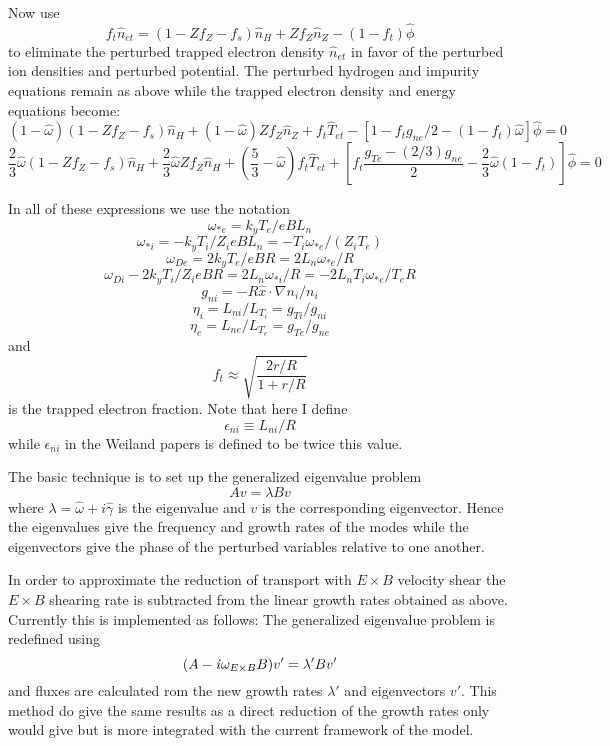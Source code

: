 Now use
\[ f_t \hat{n}_{et} = ( 1 - Z f_Z - f_s ) \hat{n}_H
   + Z f_Z \hat{n}_Z - ( 1 - f_t ) \hat{\phi} \]
to eliminate the perturbed trapped electron density $\hat{n}_{et}$
in favor of the perturbed ion densities and perturbed potential.
The perturbed hydrogen and impurity equations remain as above
while the trapped electron density and energy equations become:
\[ (1-\hat{\omega}) ( 1 - Z f_Z - f_s ) \hat{n}_H
 + (1-\hat{\omega}) Z f_Z \hat{n}_Z  + f_t \hat{T}_{et}
 - [ 1 - f_t g_{ne} / 2 - ( 1 - f_t ) \hat{\omega} ] \hat{\phi}
 = 0 \]
\[ \frac{2}{3} \hat{\omega} ( 1 - Z f_Z - f_s ) \hat{n}_H
 + \frac{2}{3} \hat{\omega} Z f_Z \hat{n}_H
 + \left( \frac{5}{3} - \hat{\omega} \right) f_t \hat{T}_{et}
 + \left[ f_t \frac{g_{Te} - (2/3) g_{ne}}{2}
   - \frac{2}{3} \hat{\omega} ( 1 - f_t ) \right] \hat{\phi}
 = 0  \]

In all of these expressions we use the notation
$$ \omega_{*e} = k_y T_e / e B L_n $$
$$ \omega_{*i} = - k_y T_i / Z_i e B L_n
    = - T_i \omega_{*e} / ( Z_i T_e ) $$
$$ \omega_{De} = 2 k_y T_e / e B R = 2 L_n \omega_{*e} / R $$
$$ \omega_{Di} - 2 k_y T_i / Z_i e B R = 2 L_n \omega_{*i} / R
   = - 2 L_n T_i \omega_{*e} / T_e R $$
$$ g_{ni} = - R \hat{x} \cdot \nabla n_i / n_i $$
$$ \eta_i = L_{ni} / L_{T_i} = g_{Ti} / g_{ni}  $$
$$ \eta_e = L_{ne} / L_{T_e} = g_{Te} / g_{ne} $$
and
$$ f_t \approx \sqrt{ \frac{ 2 r/R }{ 1 + r/R } } $$
is the trapped electron fraction.
Note that here I define 
\[ \epsilon_{ni} \equiv L_{ni} / R \]
while $ \epsilon_{ni} $ in the Weiland papers is defined to be
twice this value.

The basic technique is to set up the generalized eigenvalue problem
\[ A v = \lambda B v \]
where $ \lambda = \hat{\omega} + i \hat{\gamma} $ is the eigenvalue
and $ v $ is the corresponding eigenvector.
Hence the eigenvalues give the frequency and growth rates of the
modes while the eigenvectors give the phase of the perturbed
variables relative to one another.

In order to approximate the reduction of transport with $E\times B$ 
velocity shear the $E\times B $ shearing rate is subtracted from the 
linear growth rates obtained as above. Currently this is implemented as
follows: The generalized eigenvalue problem is redefined using  
 \[ (A - {\it i} \omega_{E\times B} B) v' = {\lambda}' B v' \]
and fluxes are calculated rom the new growth rates   ${\lambda}'$ 
and eigenvectors $v'$. This method do give the same results as a 
direct reduction of the growth rates only would give but is more 
integrated with the current framework of the model.

